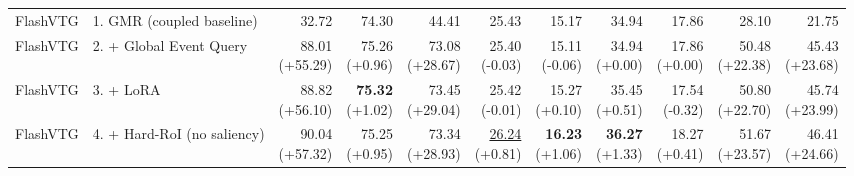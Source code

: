 \documentclass{article}
\begin{document}
{\begin{tabular}{llrrrrrrrrr}
\midrule
FlashVTG & 1. GMR (coupled baseline) & 32.72 & 74.30 & 44.41 & 25.43 & 15.17 & 34.94 & 17.86 & 28.10 & 21.75 \\
FlashVTG & 2. + Global Event Query & \shortstack{88.01 \\ {\scriptsize (+55.29)}} & \shortstack{75.26 \\ {\scriptsize (+0.96)}} & \shortstack{73.08 \\ {\scriptsize (+28.67)}} & \shortstack{25.40 \\ {\scriptsize (-0.03)}} & \shortstack{15.11 \\ {\scriptsize (-0.06)}} & \shortstack{34.94 \\ {\scriptsize (+0.00)}} & \shortstack{17.86 \\ {\scriptsize (+0.00)}} & \shortstack{50.48 \\ {\scriptsize (+22.38)}} & \shortstack{45.43 \\ {\scriptsize (+23.68)}} \\
FlashVTG & 3. + LoRA & \shortstack{88.82 \\ {\scriptsize (+56.10)}} & \shortstack{\textbf{75.32} \\ {\scriptsize (+1.02)}} & \shortstack{73.45 \\ {\scriptsize (+29.04)}} & \shortstack{25.42 \\ {\scriptsize (-0.01)}} & \shortstack{15.27 \\ {\scriptsize (+0.10)}} & \shortstack{35.45 \\ {\scriptsize (+0.51)}} & \shortstack{17.54 \\ {\scriptsize (-0.32)}} & \shortstack{50.80 \\ {\scriptsize (+22.70)}} & \shortstack{45.74 \\ {\scriptsize (+23.99)}} \\
FlashVTG & 4. + Hard-RoI (no saliency) & \shortstack{90.04 \\ {\scriptsize (+57.32)}} & \shortstack{75.25 \\ {\scriptsize (+0.95)}} & \shortstack{73.34 \\ {\scriptsize (+28.93)}} & \shortstack{\underline{26.24} \\ {\scriptsize (+0.81)}} & \shortstack{\textbf{16.23} \\ {\scriptsize (+1.06)}} & \shortstack{\textbf{36.27} \\ {\scriptsize (+1.33)}} & \shortstack{18.27 \\ {\scriptsize (+0.41)}} & \shortstack{51.67 \\ {\scriptsize (+23.57)}} & \shortstack{46.41 \\ {\scriptsize (+24.66)}} \\

\end{tabular}}
\end{document}
